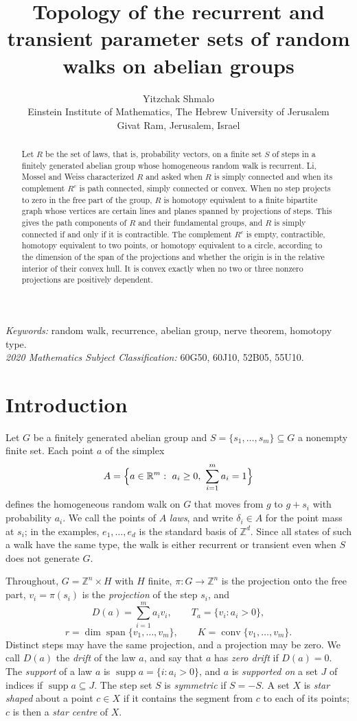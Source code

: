 \documentclass[11pt]{article}
\title{Topology of the recurrent and transient parameter sets of random walks on abelian groups}
\author{Yitzchak Shmalo\\
Einstein Institute of Mathematics, The Hebrew University of Jerusalem\\
Givat Ram, Jerusalem, Israel}
\date{}
\theoremstyle{remark}
\DeclareMathOperator{\supp}{supp}
\DeclareMathOperator{\spn}{span}
\DeclareMathOperator{\conv}{conv}
\newcommand{\R}{\mathbb{R}}
\newcommand{\Z}{\mathbb{Z}}
\begin{document}
\maketitle

\begin{abstract}
Let $R$ be the set of laws, that is, probability vectors, on a finite set $S$ of steps in a finitely generated abelian
group whose homogeneous random walk is recurrent. Li, Mossel and Weiss characterized $R$ and asked when $R$ is simply
connected and when its complement $R^c$ is path connected, simply connected or convex. When no step projects to zero in
the free part of the group, $R$ is homotopy equivalent to a finite bipartite graph whose vertices are certain lines and
planes spanned by projections of steps. This gives the path components of $R$ and their fundamental groups, and $R$ is
simply connected if and only if it is contractible. The complement $R^c$ is empty, contractible, homotopy equivalent to
two points, or homotopy equivalent to a circle, according to the dimension of the span of the projections and whether
the origin is in the relative interior of their convex hull. It is convex exactly when no two or three nonzero
projections are positively dependent.
\end{abstract}

\noindent\textit{Keywords:} random walk, recurrence, abelian group, nerve theorem, homotopy type.\\
\textit{2020 Mathematics Subject Classification:} 60G50, 60J10, 52B05, 55U10.

\section{Introduction}\label{sec:intro}

Let $G$ be a finitely generated abelian group and $S=\{s_1,\dots,s_m\}\subseteq G$ a nonempty finite set. Each point
$a$ of the simplex
\[
A=\Bigl\{a\in\R^m:\ a_i\ge 0,\ \sum_{i=1}^m a_i=1\Bigr\}
\]
defines the homogeneous random walk on $G$ that moves from $g$ to $g+s_i$ with probability $a_i$. We call the points of
$A$ \emph{laws}, and write $\delta_i\in A$ for the point mass at $s_i$; in the examples, $e_1,\dots,e_d$ is the
standard basis of $\Z^d$. Since all states of such a walk have the same type, the walk is either recurrent or transient
even when $S$ does not generate $G$.

Throughout, $G=\Z^n\times H$ with $H$ finite, $\pi\colon G\to\Z^n$ is the projection onto the free part, $v_i=\pi(s_i)$
is the \emph{projection} of the step $s_i$, and
\[
D(a)=\sum_{i=1}^m a_i v_i,\qquad T_a=\{v_i: a_i>0\},
\]
\[
r=\dim\spn\{v_1,\dots,v_m\},\qquad K=\conv\{v_1,\dots,v_m\}.
\]
Distinct steps may have the same projection, and a projection may be zero. We call $D(a)$ the \emph{drift} of the law
$a$, and say that $a$ has \emph{zero drift} if $D(a)=0$. The \emph{support} of a law $a$ is $\supp a=\{i:a_i>0\}$, and $a$ is \emph{supported on} a set
$J$ of indices if $\supp a\subseteq J$. The step set $S$ is \emph{symmetric} if $S=-S$. A set $X$ is \emph{star shaped} about a point
$c\in X$ if it contains the segment from $c$ to each of its points; $c$ is then a \emph{star centre} of $X$.
\end{document}
